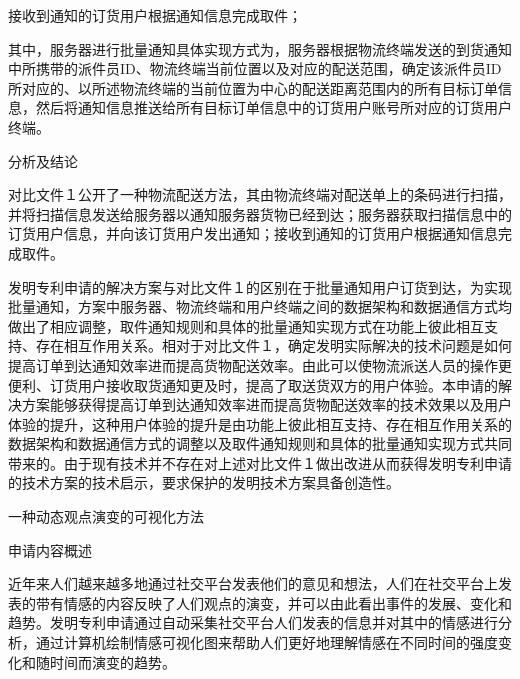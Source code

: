 {\setlength{\parindent}{20.6bp}接收到通知的订货用户根据通知信息完成取件；\par}

{\setlength{\parindent}{20.6bp}其中，服务器进行批量通知具体实现方式为，服务器根据物流终端发送的到货通知中所携带的派件员ID、物流终端当前位置以及对应的配送范围，确定该派件员ID所对应的、以所述物流终端的当前位置为中心的配送距离范围内的所有目标订单信息，然后将通知信息推送给所有目标订单信息中的订货用户账号所对应的订货用户终端。\par}

{\setlength{\parindent}{20.1bp}分析及结论\par}

{\setlength{\parindent}{20.6bp}对比文件１公开了一种物流配送方法，其由物流终端对配送单上的条码进行扫描，并将扫描信息发送给服务器以通知服务器货物已经到达；服务器获取扫描信息中的订货用户信息，并向该订货用户发出通知；接收到通知的订货用户根据通知信息完成取件。\par}

{\setlength{\parindent}{20.6bp}发明专利申请的解决方案与对比文件１的区别在于批量通知用户订货到达，为实现批量通知，方案中服务器、物流终端和用户终端之间的数据架构和数据通信方式均做出了相应调整，取件通知规则和具体的批量通知实现方式在功能上彼此相互支持、存在相互作用关系。相对于对比文件１，确定发明实际解决的技术问题是如何提高订单到达通知效率进而提高货物配送效率。由此可以使物流派送人员的操作更便利、订货用户接收取货通知更及时，提高了取送货双方的用户体验。本申请的解决方案能够获得提高订单到达通知效率进而提高货物配送效率的技术效果以及用户体验的提升，这种用户体验的提升是由功能上彼此相互支持、存在相互作用关系的数据架构和数据通信方式的调整以及取件通知规则和具体的批量通知实现方式共同带来的。由于现有技术并不存在对上述对比文件１做出改进从而获得发明专利申请的技术方案的技术启示，要求保护的发明技术方案具备创造性。\par}

{\setlength{\parindent}{15.3bp}\par}

{\setlength{\parindent}{20.6bp}一种动态观点演变的可视化方法\par}

{\setlength{\parindent}{20.1bp}申请内容概述\par}

{\setlength{\parindent}{20.6bp}近年来人们越来越多地通过社交平台发表他们的意见和想法，人们在社交平台上发表的带有情感的内容反映了人们观点的演变，并可以由此看出事件的发展、变化和趋势。发明专利申请通过自动采集社交平台人们发表的信息并对其中的情感进行分析，通过计算机绘制情感可视化图来帮助人们更好地理解情感在不同时间的强度变化和随时间而演变的趋势。\par}

